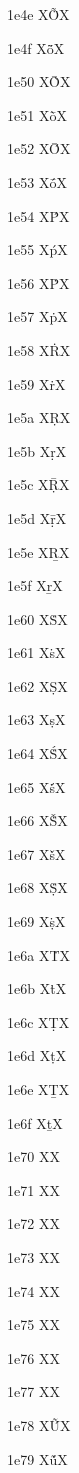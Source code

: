 \documentclass[11pt]{article}
\begin{document}
1e4e X{\"{\~{O}}}X

1e4f X{\"{\~{o}}}X

1e50 X{\`{\={O}}}X

1e51 X{\`{\={o}}}X

1e52 X{\'{\={O}}}X

1e53 X{\'{\={o}}}X

1e54 X{\'P}X

1e55 X{\'p}X

1e56 X{\.P}X

1e57 X{\.p}X

1e58 X{\.R}X

1e59 X{\.r}X

1e5a X{\d{R}}X

1e5b X{\d{r}}X

1e5c X{\={\d{R}}}X

1e5d X{\={\d{r}}}X

1e5e X{\b{R}}X

1e5f X{\b{r}}X

1e60 X{\.S}X

1e61 X{\.s}X

1e62 X{\d{S}}X

1e63 X{\d{s}}X

1e64 X{\.{\'{S}}}X

1e65 X{\.{\'{s}}}X

1e66 X{\.{\v{S}}}X

1e67 X{\.{\v{s}}}X

1e68 X{\.{\d{S}}}X

1e69 X{\.{\d{s}}}X

1e6a X{\.T}X

1e6b X{\.t}X

1e6c X{\d{T}}X

1e6d X{\d{t}}X

1e6e X{\b{T}}X

1e6f X{\b{t}}X

1e70 X{}X

1e71 X{}X

1e72 X{}X

1e73 X{}X

1e74 X{}X

1e75 X{}X

1e76 X{}X

1e77 X{}X

1e78 X{\'{\~{U}}}X

1e79 X{\'{\~{u}}}X
\end{document}
